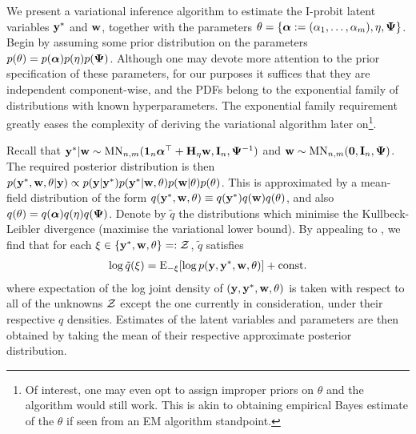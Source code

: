We present a variational inference algorithm to estimate the I-probit latent variables ${\mathbf y}^*$ and ${\mathbf w}$, together with the parameters $\theta = \{{\bm\alpha}:=(\alpha_1,\dots,\alpha_m),\eta,{\bm\Psi} \}$.
Begin by assuming some prior distribution on the parameters $p(\theta) = p({\bm\alpha})p(\eta)p({\bm\Psi})$. 
Although one may devote more attention to the prior specification of these parameters, for our purposes it suffices that they are independent component-wise, and the PDFs belong to the exponential family of distributions with known hyperparameters.
The exponential family requirement greatly eases the complexity of deriving the variational algorithm later on\footnote{
Of interest, one may even opt to assign improper priors on $\theta$ and the algorithm would still work.
This is akin to obtaining empirical Bayes estimate of the $\theta$ if seen from an EM algorithm standpoint.
}.

Recall that ${\mathbf y}^*|{\mathbf w} \sim \operatorname{MN}_{n,m}({\mathbf 1}_n{\bm\alpha}^\top  + {\mathbf H}_\eta {\mathbf w}, {\mathbf I}_n,{\bm\Psi}^{-1} )$ and ${\mathbf w} \sim \operatorname{MN}_{n,m}({\mathbf 0}, {\mathbf I}_n,{\bm\Psi})$.
The required posterior distribution is then $
  p({\mathbf y}^*,{\mathbf w},\theta|{\mathbf y}) \propto p({\mathbf y}|{\mathbf y}^*)p({\mathbf y}^*|{\mathbf w},\theta)p({\mathbf w}|\theta)p(\theta)
$.
This is approximated by a mean-field distribution of the form $q({\mathbf y}^*,{\mathbf w},\theta) \equiv q({\mathbf y}^*)q({\mathbf w})q(\theta)$, and also $q(\theta) = q({\bm\alpha})q(\eta)q({\bm\Psi})$.
Denote by $\tilde q$ the distributions which minimise the Kullbeck-Leibler divergence (maximise the variational lower bound).
By appealing to \citet[equation 10.9, p. 466]{bishop2006pattern}, we find that for each $\xi \in \{ {\mathbf y}^*,{\mathbf w},\theta \} =: {\mathcal Z}$, $\tilde q$ satisfies
\begin{align}\label{eq:qtilde}
  \log \tilde q(\xi) = \operatorname{E}_{-\xi} [\log p({\mathbf y}, {\mathbf y}^*, {\mathbf w}, \theta)] + \text{const.}\hspace{0.01em}
\end{align}
where expectation of the log joint density of $({\mathbf y}, {\mathbf y}^*, {\mathbf w}, \theta)$ is taken with respect to all of the unknowns ${\mathcal Z}$ except the one currently in consideration, under their respective $q$ densities. 
Estimates of the latent variables and parameters are then obtained by taking the mean of their respective approximate posterior distribution.

